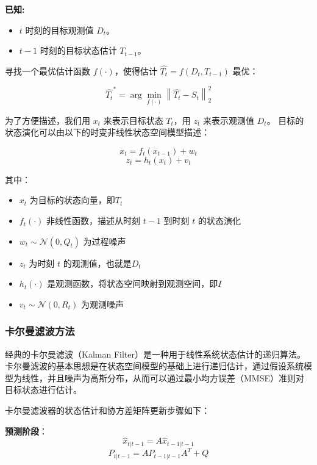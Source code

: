 \documentclass{article}
\begin{document}
\begin{tcolorbox}
    \textbf{已知:}
    \begin{itemize}
        \item $t$ 时刻的目标观测值 $D_t$。
        \item $t-1$ 时刻的目标状态估计 $T_{t-1}$。
    \end{itemize}

    寻找一个最优估计函数 $f(\cdot)$，使得估计 $\hat{T_t} = f(D_t, T_{t-1})$ 最优：

    \[
        \hat{T_t}^* = \arg\min_{f(\cdot)} \left\| \hat{T_t} - S_t \right\|_2^2
    \]

    为了方便描述，我们用 $x_t$ 来表示目标状态 $T_t$，用 $z_t$ 来表示观测值 $D_t$。
    目标的状态演化可以由以下的时变非线性状态空间模型描述：

    \[
        x_t = f_t(x_{t-1}) + w_t
    \]
    \[
        z_t = h_t(x_t) + v_t
    \]

    其中：
    \begin{itemize}[itemsep=0pt,parsep=0pt]
        \item $x_t$ 为目标的状态向量，即$T_t$
        \item $f_t(\cdot)$ 非线性函数，描述从时刻 $t-1$ 到时刻 $t$ 的状态演化
        \item $w_t \sim \mathcal{N}(0, Q_t)$ 为过程噪声
        \item $z_t$ 为时刻 $t$ 的观测值，也就是$D_t$
        \item $h_t(\cdot)$ 是观测函数，将状态空间映射到观测空间，即$I$
        \item $v_t \sim \mathcal{N}(0, R_t)$ 为观测噪声
    \end{itemize}

\end{tcolorbox}

\subsubsection{卡尔曼滤波方法}

经典的卡尔曼滤波（Kalman Filter）是一种用于线性系统状态估计的递归算法。卡尔曼滤波的基本思想是在状态空间模型的基础上进行递归估计，通过假设系统模型为线性，并且噪声为高斯分布，从而可以通过最小均方误差（MMSE）准则对目标状态进行估计。

卡尔曼滤波器的状态估计和协方差矩阵更新步骤如下：

\textbf{预测阶段}：
\[
    \hat{x}_{t|t-1} = A \hat{x}_{t-1|t-1}
\]
\[
    P_{t|t-1} = A P_{t-1|t-1} A^T + Q
\]
\end{document}
